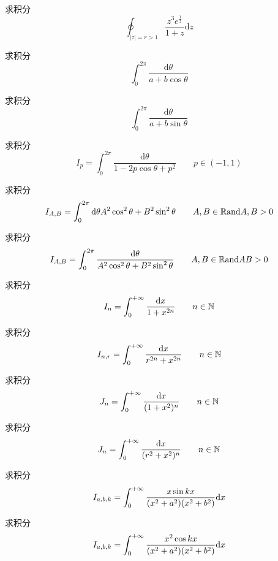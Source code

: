 \begin{homeworkProblem}
    求积分
    \[
    \oint_{|z| = r > 1}\frac{z^3 e^\frac{1}{z}}{1+z}\mathrm{d}z
    \]
\solution
\end{homeworkProblem}
\begin{homeworkProblem}
    求积分
    \[
    \int_0^{2\pi}\frac{\mathrm{d}\theta}{a+b\cos\theta}
    \]
\end{homeworkProblem}
\begin{homeworkProblem}
    求积分
    \[
    \int_0^{2\pi}\frac{\mathrm{d}\theta}{a+b\sin\theta}
    \]
\end{homeworkProblem}
\begin{homeworkProblem}
    求积分
    \[
    I_p = \int_0^{2\pi}\frac{\mathrm{d}\theta}{1-2p\cos\theta+p^2}\qquad p\in(-1,1)
    \]
\end{homeworkProblem}
\begin{homeworkProblem}
    求积分
    \[
    I_{A,B} = \int_0^{2\pi}{\mathrm{d}\theta}{A^2\cos^2\theta + B^2\sin^2\theta}\qquad A,B\in\mathbb{R} \textrm{and} A,B>0
    \]
\end{homeworkProblem}
\begin{homeworkProblem}
    求积分
    \[
    I_{A,B} = \int_0^{2\pi}\frac{\mathrm{d}\theta}{A^2\cos^2\theta + B^2\sin^2\theta}\qquad A,B\in\mathbb{R} \textrm{and} AB>0
    \]
\end{homeworkProblem}
\begin{homeworkProblem}
    求积分
    \[
    I_{n} = \int_0^{+\infty}\frac{\mathrm{d}x}{1+x^{2n}}\qquad n\in\mathbb{N}
    \]
\end{homeworkProblem}
\begin{homeworkProblem}
    求积分
    \[
    I_{n,r} = \int_0^{+\infty}\frac{\mathrm{d}x}{r^{2n}+x^{2n}}\qquad n\in\mathbb{N}
    \]
\end{homeworkProblem}
\begin{homeworkProblem}
    求积分
    \[
    J_n = \int_0^{+\infty}\frac{\mathrm{d}x}{(1+x^2)^n} \qquad n\in\mathbb{N}
    \]
\end{homeworkProblem}
\begin{homeworkProblem}
    求积分
    \[
    J_n = \int_0^{+\infty}\frac{\mathrm{d}x}{(r^2+x^2)^n} \qquad n\in\mathbb{N}
    \]
\end{homeworkProblem}
\begin{homeworkProblem}
    求积分
    \[
    I_{a,b,k} = \int_0^{+\infty}\frac{x\sin kx}{(x^2+a^2)(x^2+b^2)}\mathrm{d}x
    \]
\end{homeworkProblem}
\begin{homeworkProblem}
    求积分
    \[
    I_{a,b,k} = \int_0^{+\infty}\frac{x^2\cos kx}{(x^2+a^2)(x^2+b^2)}\mathrm{d}x
    \]
\end{homeworkProblem}
